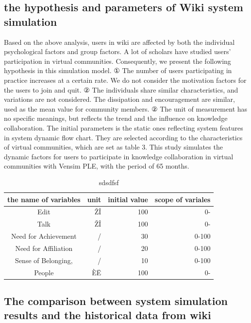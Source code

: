 \documentclass{elsarticle}
\begin{document}
\subsection{the hypothesis and parameters of Wiki system simulation }
\label{sec:hypoth-param-wiki}
Based on the above analysis, users in wiki are affected by both the individual psychological factors and group factors. A lot of scholars have studied users’ participation in virtual communities. Consequently, we present the following hypothesis in this simulation model.
① The number of users participating in practice increases at a certain rate. We do not consider the motivation factors for the users to join and quit. 
② The individuals share similar characteristics, and variations are not considered. The dissipation and encouragement are similar, used as the mean value for community members. 
② The unit of measurement has no specific meanings, but reflects the trend and the influence on knowledge collaboration.
The initial parameters is the static ones reflecting system features in system dynamic flow chart. They are selected according to the characteristics of virtual communities, which are set as table 3. This study simulates the dynamic factors for users to participate in knowledge collaboration in virtual communities with Vensim PLE, with the period of 65 months.
\begin{table}[htpb]
  \centering
 
\begin{tabular}{crrr}
    \addlinespace
    \toprule
    {\bf the name of variables} & {\bf unit} & {\bf initial value} & {\bf scope of variales} \\
    \midrule
    Edit  & ŽÎ     & 100   & 0- \\
    Talk  & ŽÎ     & 100   & 0- \\
    Need for Achievement & /     & 30    & 0-100 \\
    Need for Affiliation & /     & 20    & 0-100 \\
    Sense of Belonging, & /     & 10    & 0-100 \\
    People & ÈË     & 100   & 0- \\
    \bottomrule
    \end{tabular}
  \caption{sdsdfsf}
\end{table}


\subsection{The comparison between system simulation results and the historical data from wiki}
\label{sec:comp-betw-syst}
\end{document}
